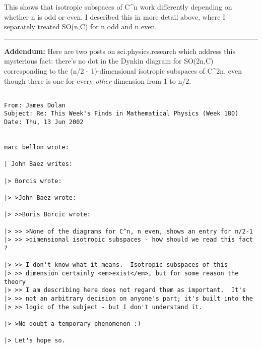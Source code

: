 This shows that isotropic subspaces of C^{n} work differently depending
on whether n is odd or even.   I described this in more detail above,
where I separately treated SO(n,C) for n odd and n even.

\par\noindent\rule{\textwidth}{0.4pt}
\textbf{Addendum:}
Here are two posts on sci.physics.research which address
this mysterious fact: there's no dot in the Dynkin diagram
for SO(2n,C) corresponding to the (n/2 - 1)-dimensional
isotropic subspaces of C^{2n}, even though there is
one for every \emph{other} dimension from 1 to n/2.

\begin{verbatim}

From: James Dolan
Subject: Re: This Week's Finds in Mathematical Physics (Week 180)
Date: Thu, 13 Jun 2002 


marc bellon wrote:

| John Baez writes:

|> Borcis wrote:

|> >John Baez wrote:
 
|> >>Boris Borcic wrote:
 
|> >> >None of the diagrams for C^n, n even, shows an entry for n/2-1 
|> >> >dimensional isotropic subspaces - how should we read this fact ?
 
|> >> I don't know what it means.  Isotropic subspaces of this
|> >> dimension certainly <em>exist</em>, but for some reason the theory
|> >> I am describing here does not regard them as important.  It's
|> >> not an arbitrary decision on anyone's part; it's built into the 
|> >> logic of the subject - but I don't understand it.
 
|> >No doubt a temporary phenomenon :)

|> Let's hope so.  


\end{verbatim}
